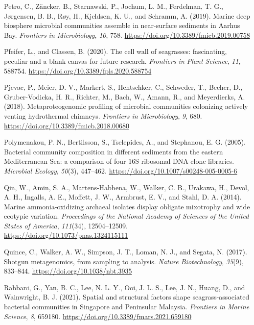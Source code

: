\documentclass[
  12 pt,
]{book}
\newlength{\cslhangindent}
\newlength{\cslentryspacingunit} %
\newenvironment{CSLReferences}[2] %
 {%
  \setlength{\parindent}{0pt}
  \ifodd #1
  \let\oldpar\par
  \def\par{\hangindent=\cslhangindent\oldpar}
  \fi
  \setlength{\parskip}{#2\cslentryspacingunit}
 }%
 {}
\begin{document}
\begin{CSLReferences}{1}{0}
\leavevmode{}%
Petro, C., Zäncker, B., Starnawski, P., Jochum, L. M., Ferdelman, T. G., Jørgensen, B. B., Røy, H., Kjeldsen, K. U., and Schramm, A. (2019). Marine deep biosphere microbial communities assemble in near-surface sediments in {Aarhus Bay}. \emph{Frontiers in Microbiology}, \emph{10}, 758. \url{https://doi.org/10.3389/fmicb.2019.00758}

\leavevmode{}%
Pfeifer, L., and Classen, B. (2020). The cell wall of seagrasses: fascinating, peculiar and a blank canvas for future research. \emph{Frontiers in Plant Science}, \emph{11}, 588754. \url{https://doi.org/10.3389/fpls.2020.588754}

\leavevmode{}%
Pjevac, P., Meier, D. V., Markert, S., Hentschker, C., Schweder, T., Becher, D., Gruber-Vodicka, H. R., Richter, M., Bach, W., Amann, R., and Meyerdierks, A. (2018). Metaproteogenomic profiling of microbial communities colonizing actively venting hydrothermal chimneys. \emph{Frontiers in Microbiology}, \emph{9}, 680. \url{https://doi.org/10.3389/fmicb.2018.00680}

\leavevmode{}%
Polymenakou, P. N., Bertilsson, S., Tselepides, A., and Stephanou, E. G. (2005). Bacterial community composition in different sediments from the eastern {Mediterranean Sea}: a comparison of four {16S} ribosomal {DNA} clone libraries. \emph{Microbial Ecology}, \emph{50}(3), 447--462. \url{https://doi.org/10.1007/s00248-005-0005-6}

\leavevmode{}%
Qin, W., Amin, S. A., Martens-Habbena, W., Walker, C. B., Urakawa, H., Devol, A. H., Ingalls, A. E., Moffett, J. W., Armbrust, E. V., and Stahl, D. A. (2014). Marine ammonia-oxidizing archaeal isolates display obligate mixotrophy and wide ecotypic variation. \emph{Proceedings of the National Academy of Sciences of the United States of America}, \emph{111}(34), 12504--12509. \url{https://doi.org/10.1073/pnas.1324115111}

\leavevmode{}%
Quince, C., Walker, A. W., Simpson, J. T., Loman, N. J., and Segata, N. (2017). Shotgun metagenomics, from sampling to analysis. \emph{Nature Biotechnology}, \emph{35}(9), 833--844. \url{https://doi.org/10.1038/nbt.3935}

\leavevmode{}%
Rabbani, G., Yan, B. C., Lee, N. L. Y., Ooi, J. L. S., Lee, J. N., Huang, D., and Wainwright, B. J. (2021). Spatial and structural factors shape seagrass-associated bacterial communities in {Singapore} and {Peninsular Malaysia}. \emph{Frontiers in Marine Science}, \emph{8}, 659180. \url{https://doi.org/10.3389/fmars.2021.659180}


\end{CSLReferences}
\end{document}
